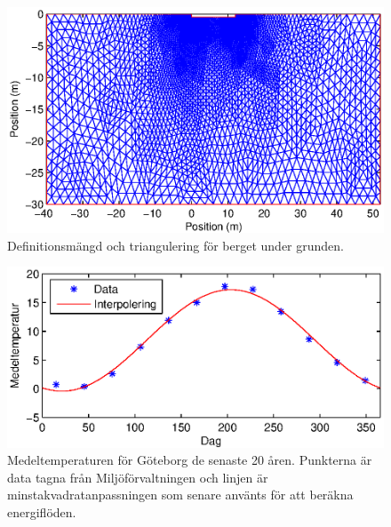 \begin{figure}
\centering
\includegraphics{images/trifoundation.eps}
\caption{Definitionsmängd och triangulering för berget under grunden.}
\label{fig:foundation:tri}
\end{figure}


\begin{figure}
\centering
\includegraphics{images/meantemperature.eps}
\caption{
Medeltemperaturen för Göteborg de senaste 20 åren. Punkterna är data tagna från Miljöförvaltningen och linjen är minstakvadratanpassningen som senare använts för att beräkna energiflöden.}
\label{fig:foundation:meantemperature}
\end{figure}

